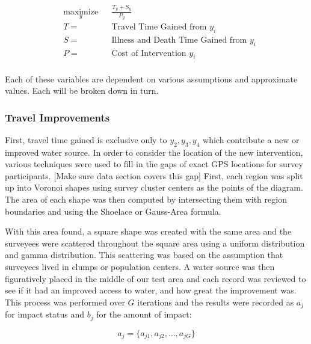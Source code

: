 \begin{equation}
\begin{aligned}
& \underset{y}{\text{maximize}}
& & \frac{T_y + S_y}{P_y}  \\
& T =
& & \text{Travel Time Gained from } y_i \\
& S =
& & \text{Illness and Death Time Gained from } y_i \\
& P =
& & \text{Cost of Intervention } y_i \\
\end{aligned}
\end{equation}

Each of these variables are dependent on various assumptions and approximate values.
Each will be broken down in turn.

\subsubsection*{Travel Improvements}
First, travel time gained is exclusive only to $y_2,y_3,y_4$ which contribute a new or improved water source.
In order to consider the location of the new intervention, various techniques were used to fill in the gaps of exact GPS locations for survey participants.
[Make sure data section covers this gap]
First, each region was split up into Voronoi shapes using survey cluster centers as the points of the diagram. %
The area of each shape was then computed by intersecting them with region boundaries and using the Shoelace or Gauss-Area formula. %

With this area found, a square shape was created with the same area and the surveyees were scattered throughout the square area using a uniform distribution and gamma distribution.
This scattering was based on the assumption that surveyees lived in clumps or population centers.
A water source was then figuratively placed in the middle of our test area and each record was reviewed to see if it had an improved access to water, and how great the improvement was.
This process was performed over $G$ iterations and the results were recorded as $a_j$ for impact status and $b_j$ for the amount of impact:


\begin{equation*}
a_j = \{a_{j1},a_{j2},...,a_{jG}\}
\end{equation*}


